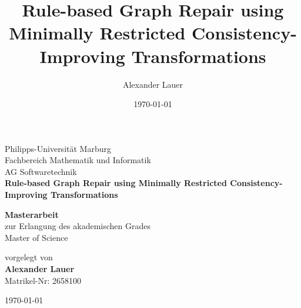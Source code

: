 \documentclass[11pt,a4paper]{article}
\title{Rule-based Graph Repair using Minimally Restricted Consistency-Improving Transformations}
\author{Alexander Lauer}
\date{\today}
\numberwithin{equation}{section}
\begin{document}
\begin{titlepage}
    \begin{center}
        \vspace*{1cm}
        \Large
        Philipps-Universität Marburg\\
        Fachbereich Mathematik und Informatik\\
        AG Softwaretechnik \\
        \vspace*{1cm}
        \Large
        \textbf{Rule-based Graph Repair using Minimally Restricted Consistency-Improving Transformations}
            
            
        \vspace{1.5cm}
            
        \textbf{Masterarbeit}\\
        zur Erlangung des akademischen Grades \\
        Master of Science
        
        \vspace{1.5cm}
        vorgelegt von\\
        \textbf{Alexander Lauer}\\
        Matrikel-Nr: 2658100
            
    
            
        \vspace{1.5cm}
            
        
            
        
        
        \today\\
        
    \end{center}
\end{titlepage}

\pagestyle{empty}
\newpage\null\newpage


\newpage\null\newpage
\pagestyle{plain}

\newpage

\tableofcontents
\newpage\null\newpage













\newpage



\end{document}

